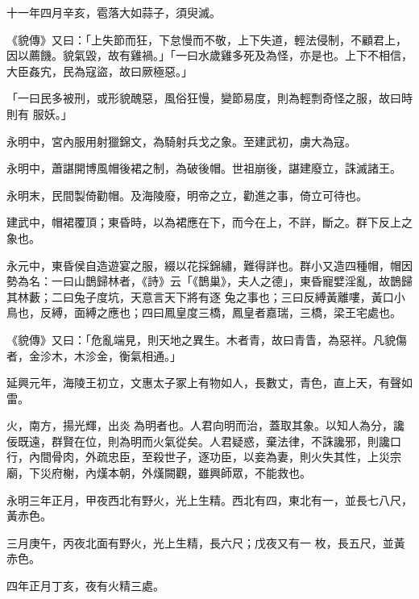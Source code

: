 \begin{pinyinscope}
 十一年四月辛亥，雹落大如蒜子，須臾滅。



 《貌傳》又曰：「上失節而狂，下怠慢而不敬，上下失道，輕法侵制，不顧君上，因以薦饑。貌氣毀，故有雞禍。」「一曰水歲雞多死及為怪，亦是也。上下不相信，大臣姦宄，民為寇盜，故曰厥極惡。」



 「一曰民多被刑，或形貌醜惡，風俗狂慢，變節易度，則為輕剽奇怪之服，故曰時則有
 服妖。」



 永明中，宮內服用射獵錦文，為騎射兵戈之象。至建武初，虜大為寇。



 永明中，蕭諶開博風帽後裙之制，為破後帽。世祖崩後，諶建廢立，誅滅諸王。



 永明末，民間製倚勸帽。及海陵廢，明帝之立，勸進之事，倚立可待也。



 建武中，帽裙覆頂；東昏時，以為裙應在下，而今在上，不詳，斷之。群下反上之象也。



 永元中，東昏侯自造遊宴之服，綴以花採錦繡，難得詳也。群小又造四種帽，帽因勢為名：一曰山鵲歸林者，《詩》云「《鵲巢》，夫人之德」，東昏寵嬖淫亂，故鵲歸其林藪；二曰兔子度坑，天意言天下將有逐
 兔之事也；三曰反縛黃離嘍，黃口小鳥也，反縛，面縛之應也；四曰鳳皇度三橋，鳳皇者嘉瑞，三橋，梁王宅處也。



 《貌傳》又曰：「危亂端見，則天地之異生。木者青，故曰青眚，為惡祥。凡貌傷者，金沴木，木沴金，衡氣相通。」



 延興元年，海陵王初立，文惠太子冢上有物如人，長數丈，青色，直上天，有聲如雷。



 火，南方，揚光輝，出炎𤓀為明者也。人君向明而治，蓋取其象。以知人為分，讒佞既遠，群賢在位，則為明而火氣從矣。人君疑惑，棄法律，不誅讒邪，則讒口行，內間骨肉，外疏忠臣，至殺世子，逐功臣，以妾為妻，則火失其性，上災宗廟，下災府榭，內熯本朝，外熯闕觀，雖興師眾，不能救也。



 永明三年正月，甲夜西北有野火，光上生精。西北有四，東北有一，並長七八尺，黃赤色。



 三月庚午，丙夜北面有野火，光上生精，長六尺；戊夜又有一
 枚，長五尺，並黃赤色。



 四年正月丁亥，夜有火精三處。




\end{pinyinscope}
